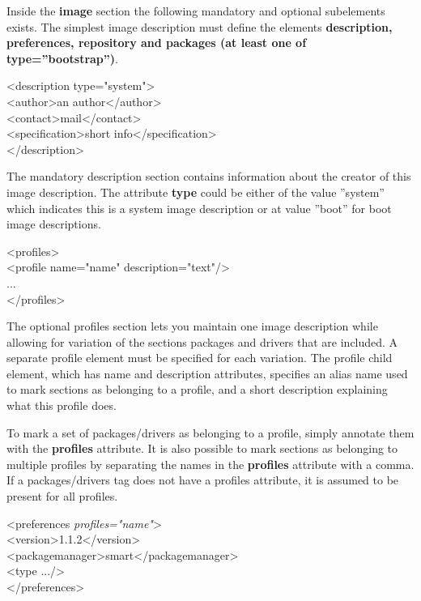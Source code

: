 Inside the \textbf{image} section the following mandatory and optional
subelements exists. The simplest image description must define the
elements \textbf{description, preferences, repository and
packages (at least one of type=''bootstrap'')}.

\begin{Command}{12cm}
<description type="system">\\
\hspace*{1cm}<author>an author</author>\\
\hspace*{1cm}<contact>mail</contact>\\
\hspace*{1cm}<specification>short info</specification>\\
</description>
\end{Command}

The mandatory description section contains information about
the creator of this image description. The attribute \textbf{type}
could be either of the value ''system'' which indicates this is a
system image description or at value ''boot'' for boot image
descriptions.

\begin{Command}{12cm}
<profiles>\\
\hspace*{1cm}<profile name="name" description="text"/>\\
\hspace*{1cm}...\\
</profiles>
\end{Command}

The optional profiles section lets you maintain one image description
while allowing for variation of the sections packages and drivers that are
included. A separate profile element must be specified for each variation.
The profile child element, which has name and description attributes,
specifies an alias name used to mark sections as belonging to a profile,
and a short description explaining what this profile does.

To mark a set of packages/drivers as belonging to a profile, simply
annotate them with the \textbf{profiles} attribute. It is also possible
to mark sections as belonging to multiple profiles by separating the
names in the \textbf{profiles} attribute with a comma.
If a packages/drivers tag does not have a profiles attribute, it is
assumed to be present for all profiles.

\begin{Command}{12cm}
<preferences \textit{profiles="name"}>\\
\hspace*{1cm}<version>1.1.2</version>\\
\hspace*{1cm}<packagemanager>smart</packagemanager>\\
\hspace*{1cm}<type .../>\\
</preferences>
\end{Command}

